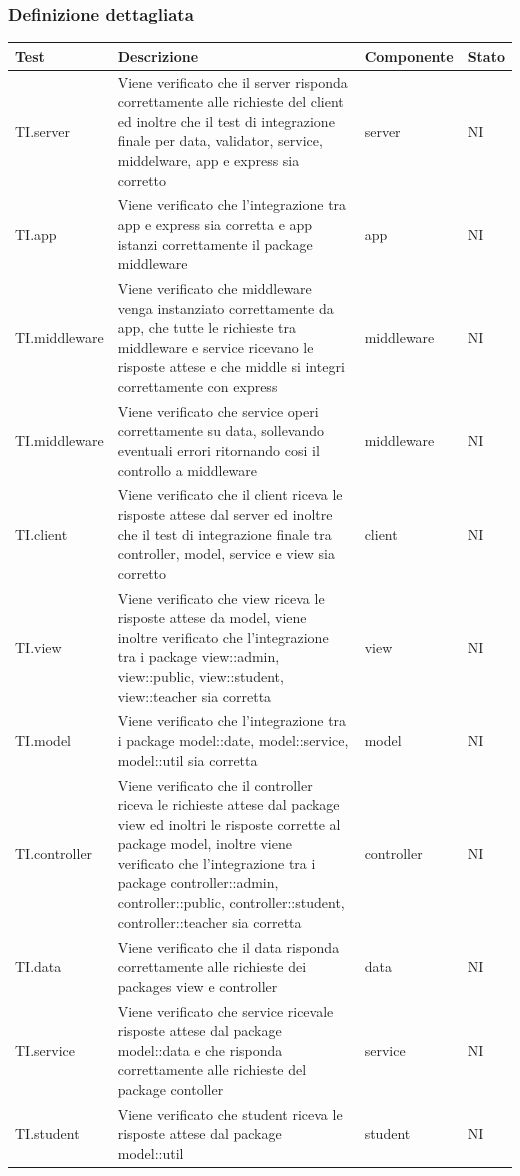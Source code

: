 \documentclass[12pt,a4paper]{article}
\begin{document}
	\subsubsection{Definizione dettagliata}
	\begin{longtable}{l p{6cm} l l}
		\midrule
		\textbf{Test} & \textbf{Descrizione} & \textbf{Componente} & \textbf{Stato} \tabularnewline
		\midrule
		\midrule
		TI.server & Viene verificato che il server risponda correttamente alle richieste del client ed inoltre che il test di integrazione finale per data, validator, service, middelware, app e express sia corretto & server & NI\tabularnewline
		\midrule
		TI.app & Viene verificato che  l'integrazione tra app e express sia corretta e app istanzi correttamente il package middleware & app & NI\tabularnewline
		\midrule
		TI.middleware & Viene verificato che middleware venga instanziato correttamente da app, che tutte le richieste tra middleware e service ricevano le risposte attese e che middle si integri correttamente con express  & middleware & NI\tabularnewline
		\midrule
		TI.middleware & Viene verificato che service operi correttamente su data, sollevando eventuali errori ritornando cosi il controllo a middleware & middleware & NI\tabularnewline
		\midrule
		TI.client & Viene verificato che il client riceva le risposte attese dal server ed inoltre che il test di integrazione finale tra controller, model, service e view sia corretto & client & NI\tabularnewline
		\midrule
		TI.view & Viene verificato che view riceva le risposte attese da model, viene inoltre verificato che l'integrazione tra i package view::admin, view::public, view::student, view::teacher sia corretta & view & NI\tabularnewline
		\midrule
		TI.model & Viene verificato che l'integrazione tra i package model::date, model::service, model::util sia corretta & model & NI\tabularnewline
		\midrule
		TI.controller & Viene verificato che il controller riceva le richieste attese dal package view ed inoltri le risposte corrette al package model, inoltre viene verificato che l'integrazione tra i package controller::admin, controller::public, controller::student, controller::teacher sia corretta & controller & NI\tabularnewline
		\midrule
		TI.data & Viene verificato che il data risponda correttamente alle richieste dei packages view e controller & data & NI\tabularnewline
		\midrule
		TI.service & Viene verificato che service ricevale risposte attese dal package model::data e che risponda correttamente alle richieste del package contoller & service & NI\tabularnewline
		\midrule
		TI.student & Viene verificato che student riceva le risposte attese dal package model::util & student & NI\tabularnewline

\end{longtable}
\end{document}
